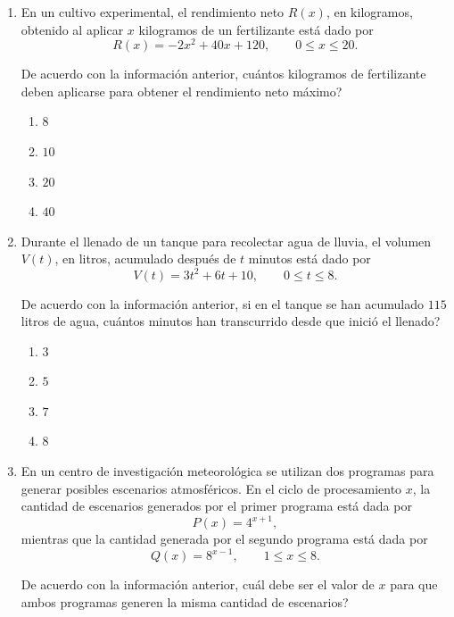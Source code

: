 \documentclass[12pt]{article}
\newcommand{\opcion}[2]{\item $#2$}
\begin{document}
\begin{enumerate}[label=\textbf{\arabic*.}, start=29, itemsep=1cm]
Si una persona utiliza una bicicleta convencional durante $5$ horas completas, \textquestiondown cu\'al es el monto total, en colones, que debe pagar?

\begin{enumerate}[label=\Alph*)]
  \opcion{A}{4250}
  \opcion{B}{4600}
  \opcion{C}{5450}
  \opcion{D}{6000}
\end{enumerate}

\Needspace{0.36\textheight}
\item
En un cultivo experimental, el rendimiento neto $R(x)$, en kilogramos, obtenido al aplicar $x$ kilogramos de un fertilizante est\'a dado por
\[
  R(x)=-2x^2+40x+120, \qquad 0\leq x\leq 20.
\]

De acuerdo con la informaci\'on anterior, \textquestiondown cu\'antos kilogramos de fertilizante deben aplicarse para obtener el rendimiento neto m\'aximo?

\begin{enumerate}[label=\Alph*)]
  \opcion{A}{8}
  \opcion{B}{10}
  \opcion{C}{20}
  \opcion{D}{40}
\end{enumerate}

\Needspace{0.34\textheight}
\item
Durante el llenado de un tanque para recolectar agua de lluvia, el volumen $V(t)$, en litros, acumulado despu\'es de $t$ minutos est\'a dado por
\[
  V(t)=3t^2+6t+10, \qquad 0\leq t\leq 8.
\]

De acuerdo con la informaci\'on anterior, si en el tanque se han acumulado $115$ litros de agua, \textquestiondown cu\'antos minutos han transcurrido desde que inici\'o el llenado?

\begin{enumerate}[label=\Alph*)]
  \opcion{A}{3}
  \opcion{B}{5}
  \opcion{C}{7}
  \opcion{D}{8}
\end{enumerate}

\Needspace{0.38\textheight}
\item
En un centro de investigaci\'on meteorol\'ogica se utilizan dos programas para generar posibles escenarios atmosf\'ericos. En el ciclo de procesamiento $x$, la cantidad de escenarios generados por el primer programa est\'a dada por
\[
  P(x)=4^{x+1},
\]
mientras que la cantidad generada por el segundo programa est\'a dada por
\[
  Q(x)=8^{x-1}, \qquad 1\leq x\leq 8.
\]

De acuerdo con la informaci\'on anterior, \textquestiondown cu\'al debe ser el valor de $x$ para que ambos programas generen la misma cantidad de escenarios?


\end{enumerate}
\end{document}

